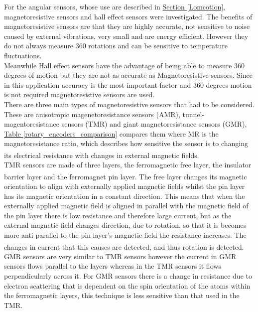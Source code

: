 \documentclass[11pt]{article}		%
\newcommand{\supercite}[1]{\textsuperscript{\cite{#1}}}		%
\newcommand{\tableref}[1]{\hyperref[#1]{Table \ref*{#1}}}     %
\newcommand{\sectref}[1]{\hyperref[#1]{Section \ref*{#1}}}     %
\begin{document}
            
            For the angular sensors, whose use are described in \sectref{Lomcotion}, magnetoresistive sensors and hall effect sensors were investigated. 
            The benefits of magnetoresistive sensors are that they are highly accurate, not sensitive to noise caused by external vibrations, very small and are energy efficient.
            However they do not always measure 360 rotations and can be sensitive to temperature fluctuations. 
            \\
            Meanwhile Hall effect sensors have the advantage of being able to measure 360 degrees of motion but they are not as accurate as Magnetoresistive sensors. 
            Since in this application accuracy is the most important factor and 360 degrees motion is not required magnetoresistive sensors are used.
            \\
            There are three main types of magnetoresistive sensors that had to be considered.
            These are anisotropic magenetoresistance sensors (AMR), tunnel-magentoresistance sensors (TMR) and giant magnetoresistance sensors (GMR),
            \tableref{rotary_encoders_comparison} compares them where MR is the magnetoresistance ratio, which describes how sensitive the sensor is to changing its electrical resistance with changes in external magnetic fields.\supercite{magnetoresistance}
            \\
            TMR sensors are made of three layers, the ferromagnetic free layer, the insulator barrier layer and the ferromagnet pin layer.\supercite{Tunnel_magnetoresistance} 
            The free layer changes its magnetic orientation to align with externally applied magnetic fields whilst the pin layer has its magnetic orientation in a constant direction.
            This means that when the externally applied magnetic field is aligned in parallel with the magnetic field of the pin layer there is low resistance and therefore large current, but as the external magnetic field changes direction, due to rotation, so that it is becomes more anti-parallel to the pin layer’s magnetic field the resistance increases. 
            The changes in current that this causes are detected, and thus rotation is detected. \supercite{explanation_magntoresistance1} 
            \\
            GMR sensors are very similar to TMR sensors however the current in GMR sensors flows parallel to the layers whereas in the TMR sensors it flows perpendicularly across it.
            For GMR sensors there is a change in resistance due to electron scattering that is dependent on the spin orientation of the atoms within the ferromagnetic layers, this technique is less sensitive than that used in the TMR.
\end{document}
